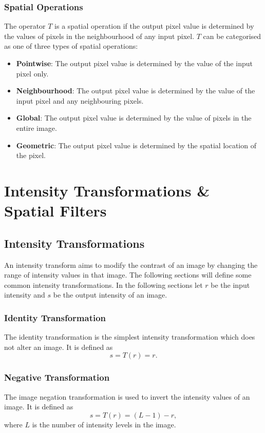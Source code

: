 \documentclass{article}
\begin{document}
\subsubsection{Spatial Operations}
The operator \(T\) is a spatial operation if the output pixel value is
determined by the values of pixels in the neighbourhood of any input
pixel. \(T\) can be categorised as one of three types of spatial
operations:
\begin{itemize}
    \item \textbf{Pointwise}: The output pixel value is
          determined by the value of the input pixel only.
    \item \textbf{Neighbourhood}: The output pixel value is
          determined by the value of the input pixel and any
          neighbouring pixels.
    \item \textbf{Global}: The output pixel value is
          determined by the value of pixels in the entire image.
    \item \textbf{Geometric}: The output pixel value is
          determined by the spatial location of the pixel.
\end{itemize}
\section{Intensity Transformations \& Spatial Filters}
\subsection{Intensity Transformations}
An intensity transform aims to modify the contrast of an image by
changing the range of intensity values in that image. The following
sections will define some common intensity transformations. In the
following sections let \(r\) be the input intensity and \(s\) be the
output intensity of an image.
\subsubsection{Identity Transformation}
The identity transformation is the simplest intensity transformation
which does not alter an image. It is defined as
\begin{equation*}
    s = T\left( r \right) = r.
\end{equation*}
\subsubsection{Negative Transformation}
The image negation transformation is used to invert the intensity
values of an image. It is defined as
\begin{equation*}
    s = T\left( r \right) = \left( L - 1 \right) - r,
\end{equation*}
where \(L\) is the number of intensity levels in the image.
\end{document}
